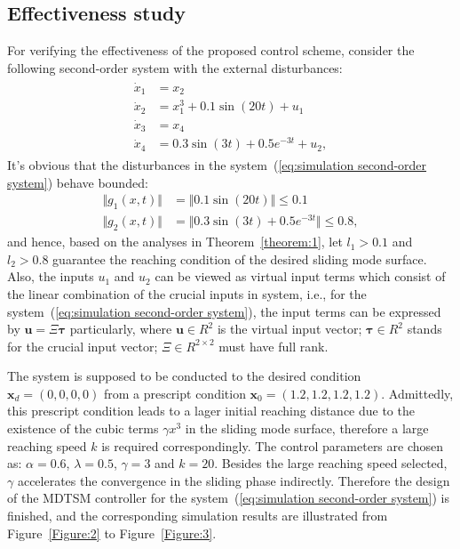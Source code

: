 \documentclass[3p]{elsarticle}
\theoremstyle{plain}
\theoremstyle{remark}
\begin{document}
\subsection{Effectiveness study}
For verifying the effectiveness of the proposed control scheme, consider the following second-order system with the external disturbances:
\begin{align}
\begin{split}
\dot x_1 &= x_2\\
\dot x_2 &= x_1^3+0.1\sin(20t)+u_1\\
\dot x_3 &= x_4\\
\dot x_4 &= 0.3\sin(3t)+0.5e^{-3t}+u_2,\label{eq:simulation second-order system}
\end{split}
\end{align}
It's obvious that the disturbances in the system~(\ref{eq:simulation second-order system}) behave bounded:
\begin{align*}
\Vert g_1(x,t)\Vert &= \Vert 0.1\sin(20t)\Vert\le 0.1\\
\Vert g_2(x,t)\Vert &= \Vert 0.3\sin(3t)+0.5e^{-3t}\Vert\le 0.8,
\end{align*}
and hence, based on the analyses in Theorem~\ref{theorem:1}, let $l_1>0.1$ and $l_2>0.8$ guarantee the reaching condition of the desired sliding mode  surface. Also, the inputs $u_1$ and $u_2$ can be viewed as virtual input terms which consist of the linear combination of the crucial inputs in system, i.e., for the system~(\ref{eq:simulation second-order system}), the input terms can be expressed by $\bm u = \Xi\bm\tau$ particularly, where $\bm u\in R^2$ is the virtual input vector; $\bm \tau\in R^2$ stands for the crucial input vector; $\Xi\in R^{2\times 2}$ must have full rank.\par
The system is supposed to be conducted to the desired condition $\bm x_d=(0,0,0,0)$ from a prescript condition $\bm x_0=(1.2,1.2,1.2,1.2)$. Admittedly, this prescript condition leads to a lager initial reaching distance due to the existence of the cubic terms $\gamma x^3$ in the sliding mode  surface, therefore a large reaching speed $k$ is required correspondingly. The control parameters are chosen as: $\alpha = 0.6$, $\lambda = 0.5$, $\gamma = 3$ and $k = 20$. Besides the large reaching speed selected, $\gamma$ accelerates the convergence in the sliding phase indirectly. Therefore the design of the MDTSM controller for the system~(\ref{eq:simulation second-order system}) is finished, and the corresponding simulation results are illustrated from Figure~\ref{Figure:2} to Figure~\ref{Figure:3}.
\end{document}
